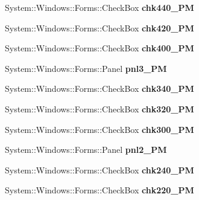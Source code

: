 \begin{DoxyCompactItemize}
System\+::\+Windows\+::\+Forms\+::\+Check\+Box {\bfseries chk440\+\_\+PM}
\item 
\mbox{\label{class_project1_1_1_my_form_adc40f16e80d294080d06dad0823b493e}} 
System\+::\+Windows\+::\+Forms\+::\+Check\+Box {\bfseries chk420\+\_\+PM}
\item 
\mbox{\label{class_project1_1_1_my_form_aa64f5b6977d24a9971fbddba16ea8ec2}} 
System\+::\+Windows\+::\+Forms\+::\+Check\+Box {\bfseries chk400\+\_\+PM}
\item 
\mbox{\label{class_project1_1_1_my_form_ace59267a9b0434e74b37d3be7a09e4f0}} 
System\+::\+Windows\+::\+Forms\+::\+Panel {\bfseries pnl3\+\_\+PM}
\item 
\mbox{\label{class_project1_1_1_my_form_a921f29eee5bc22595cf2dada46ae4e8d}} 
System\+::\+Windows\+::\+Forms\+::\+Check\+Box {\bfseries chk340\+\_\+PM}
\item 
\mbox{\label{class_project1_1_1_my_form_ac0af2c4fbc14becb3331891d6b0744ba}} 
System\+::\+Windows\+::\+Forms\+::\+Check\+Box {\bfseries chk320\+\_\+PM}
\item 
\mbox{\label{class_project1_1_1_my_form_aa48d2b56a8a122cf6bffd090aa2cc66b}} 
System\+::\+Windows\+::\+Forms\+::\+Check\+Box {\bfseries chk300\+\_\+PM}
\item 
\mbox{\label{class_project1_1_1_my_form_ae8d0c1bf957e87c4f22efa697ddde245}} 
System\+::\+Windows\+::\+Forms\+::\+Panel {\bfseries pnl2\+\_\+PM}
\item 
\mbox{\label{class_project1_1_1_my_form_a2e4c79b98410a3960027fc26a3c75eec}} 
System\+::\+Windows\+::\+Forms\+::\+Check\+Box {\bfseries chk240\+\_\+PM}
\item 
\mbox{\label{class_project1_1_1_my_form_a0ab38614ef6bd8d813da5d52ba4876aa}} 
System\+::\+Windows\+::\+Forms\+::\+Check\+Box {\bfseries chk220\+\_\+PM}
\item 

\end{DoxyCompactItemize}
